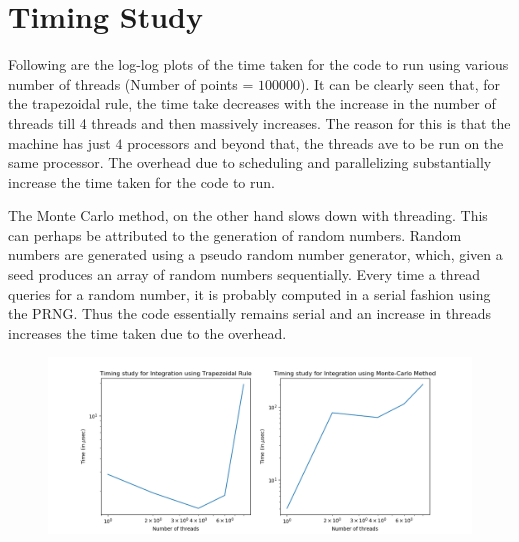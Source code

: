 \documentclass{article}
\begin{document}
\newpage
\section{Timing Study}

Following are the log-log plots of the time taken for the code to run using various number of threads (Number of points = $100000$). It can be clearly seen that, for the trapezoidal rule, the time take decreases with the increase in the number of threads till 4 threads and then massively increases. The reason for this is that the machine has just $4$ processors and beyond that, the threads ave to be run on the same processor. The overhead due to scheduling and parallelizing substantially increase the time taken for the code to run.

The Monte Carlo method, on the other hand slows down with threading. This can perhaps be attributed to the generation of random numbers. Random numbers are generated using a pseudo random number generator, which, given a seed produces an array of random numbers sequentially. Every time a thread queries for a random number, it is probably computed in a serial fashion using the PRNG. Thus the code essentially remains serial and an increase in threads increases the time taken due to the overhead. 
\begin{figure}[h!]
\centering
\includegraphics[scale=0.6]{timing}
\end{figure}
\end{document}
